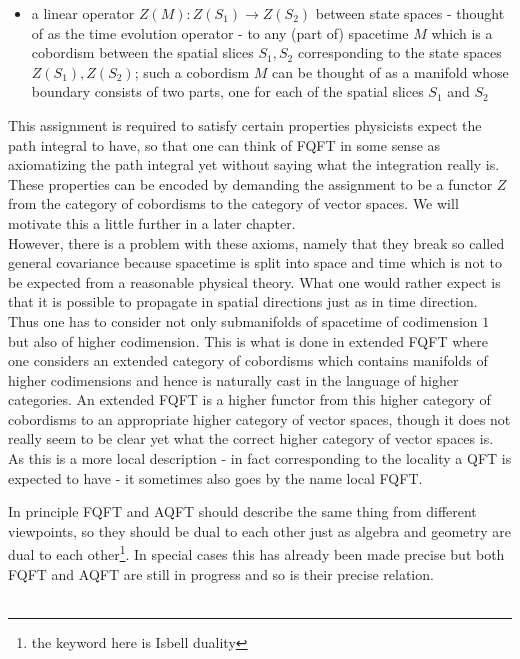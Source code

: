 \begin{itemize}
\begin{itemize}
\item
a linear operator $Z(M) \colon Z(S_{1}) \to Z(S_{2})$ between state spaces - thought of as the time evolution operator - to any (part of) spacetime $M$ which is a cobordism between the spatial slices $S_{1},S_{2}$ corresponding to the state spaces $Z(S_{1}),Z(S_{2})$; such a cobordism $M$ can be thought of as a manifold whose boundary consists of two parts, one for each of the spatial slices $S_{1}$ and $S_{2}$
\end{itemize}
This assignment is required to satisfy certain properties physicists expect the path integral to have, so that one can think of FQFT in some sense as axiomatizing the path integral yet without saying what the integration really is. These properties can be encoded by demanding the assignment to be a functor $Z$ from the category of cobordisms to the category of vector spaces. We will motivate this a little further in a later chapter.
\\
However, there is a problem with these axioms, namely that they break so called general covariance because spacetime is split into space and time which is not to be expected from a {\glqq}reasonable{\grqq} physical theory. What one would rather expect is that it is possible to {\glqq}propagate{\grqq} in spatial directions just as in time direction. Thus one has to consider not only submanifolds of spacetime of codimension $1$ but also of higher codimension. This is what is done in extended FQFT where one considers an extended category of cobordisms which contains manifolds of higher codimensions and hence is naturally cast in the language of higher categories. An extended FQFT is a higher functor from this higher category of cobordisms to an appropriate higher category of vector spaces, though it does not really seem to be clear yet what the {\glqq}correct{\grqq} higher category of vector spaces is. As this is a more local description - in fact corresponding to the locality a QFT is expected to have - it sometimes also goes by the name local FQFT.
\end{itemize}
In principle FQFT and AQFT should describe the same thing from different viewpoints, so they should be dual to each other just as algebra and geometry are dual to each other\footnote{the keyword here is Isbell duality}. In special cases this has already been made precise but both FQFT and AQFT are still in progress and so is their precise relation.
\\\\
